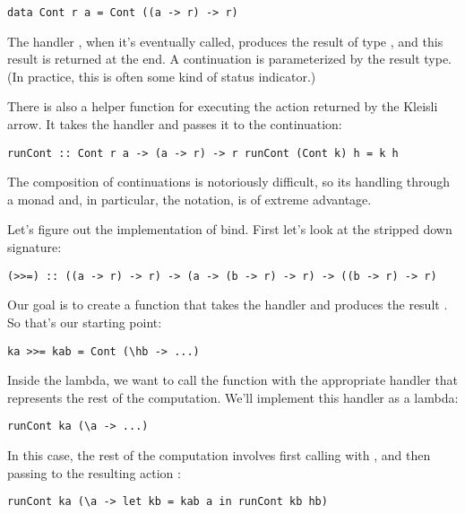 \begin{verbatim}
data Cont r a = Cont ((a -> r) -> r)
\end{verbatim}

The handler , when it's eventually called,
produces the result of type , and this result is returned at
the end. A continuation is parameterized by the result type. (In
practice, this is often some kind of status indicator.)

There is also a helper function for executing the action returned by the
Kleisli arrow. It takes the handler and passes it to the continuation:

\begin{verbatim}
runCont :: Cont r a -> (a -> r) -> r runCont (Cont k) h = k h
\end{verbatim}

The composition of continuations is notoriously difficult, so its
handling through a monad and, in particular, the  notation,
is of extreme advantage.

Let's figure out the implementation of bind. First let's look at the
stripped down signature:

\begin{verbatim}
(>>=) :: ((a -> r) -> r) -> (a -> (b -> r) -> r) -> ((b -> r) -> r)
\end{verbatim}

Our goal is to create a function that takes the handler
 and produces the result . So
that's our starting point:

\begin{verbatim}
ka >>= kab = Cont (\hb -> ...)
\end{verbatim}

Inside the lambda, we want to call the function  with the
appropriate handler that represents the rest of the computation. We'll
implement this handler as a lambda:

\begin{verbatim}
runCont ka (\a -> ...)
\end{verbatim}

In this case, the rest of the computation involves first calling
 with , and then passing  to the
resulting action :

\begin{verbatim}
runCont ka (\a -> let kb = kab a in runCont kb hb)
\end{verbatim}

